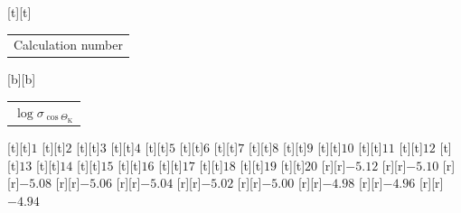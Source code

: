 %    
%
%
\begin{psfrags}%
\psfragscanon%
%
[t][t]{\color[rgb]{0,0,0}\setlength{\tabcolsep}{0pt}\begin{tabular}{c}{\Large{}Calculation number}\end{tabular}}%
[b][b]{\color[rgb]{0,0,0}\setlength{\tabcolsep}{0pt}\begin{tabular}{c}{\Large$\log \sigma_{\cos\Theta_\mathrm{K}}$}\end{tabular}}%
%
[t][t]{$1$}%
[t][t]{$2$}%
[t][t]{$3$}%
[t][t]{$4$}%
[t][t]{$5$}%
[t][t]{$6$}%
[t][t]{$7$}%
[t][t]{$8$}%
[t][t]{$9$}%
[t][t]{$10$}%
[t][t]{$11$}%
[t][t]{$12$}%
[t][t]{$13$}%
[t][t]{$14$}%
[t][t]{$15$}%
[t][t]{$16$}%
[t][t]{$17$}%
[t][t]{$18$}%
[t][t]{$19$}%
[t][t]{$20$}%
%
[r][r]{$-5.12$}%
[r][r]{$-5.10$}%
[r][r]{$-5.08$}%
[r][r]{$-5.06$}%
[r][r]{$-5.04$}%
[r][r]{$-5.02$}%
[r][r]{$-5.00$}%
[r][r]{$-4.98$}%
[r][r]{$-4.96$}%
[r][r]{$-4.94$}%
%
%
\end{psfrags}%
%
